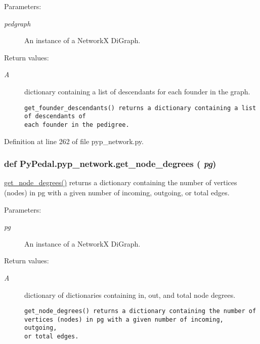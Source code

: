 \begin{Desc}
\item[Parameters:]
\begin{description}
\item[{\em pedgraph}]An instance of a Network\-X Di\-Graph. \end{description}
\end{Desc}
\begin{Desc}
\item[Return values:]
\begin{description}
\item[{\em A}]dictionary containing a list of descendants for each founder in the graph.

\footnotesize\begin{verbatim}get_founder_descendants() returns a dictionary containing a list of descendants of
each founder in the pedigree.
\end{verbatim}
\normalsize
 \end{description}
\end{Desc}


Definition at line 262 of file pyp\_\-network.py.\hypertarget{namespacePyPedal_1_1pyp__network_99fa1fd8ff5dc1479afeec03ec4ce9fe}{
\subsubsection[get\_\-node\_\-degrees]{\setlength{\rightskip}{0pt plus 5cm}def Py\-Pedal.pyp\_\-network.get\_\-node\_\-degrees ( {\em pg})}}
\label{namespacePyPedal_1_1pyp__network_99fa1fd8ff5dc1479afeec03ec4ce9fe}


\hyperlink{namespacePyPedal_1_1pyp__network_99fa1fd8ff5dc1479afeec03ec4ce9fe}{get\_\-node\_\-degrees()} returns a dictionary containing the number of vertices (nodes) in pg with a given number of incoming, outgoing, or total edges. 

\begin{Desc}
\item[Parameters:]
\begin{description}
\item[{\em pg}]An instance of a Network\-X Di\-Graph. \end{description}
\end{Desc}
\begin{Desc}
\item[Return values:]
\begin{description}
\item[{\em A}]dictionary of dictionaries containing in, out, and total node degrees.

\footnotesize\begin{verbatim}get_node_degrees() returns a dictionary containing the number of
vertices (nodes) in pg with a given number of incoming, outgoing,
or total edges.
\end{verbatim}
\normalsize
 \end{description}
\end{Desc}


